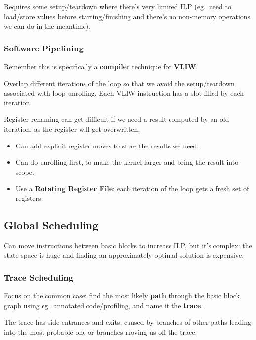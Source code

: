 \documentclass[a4paper, 11pt]{article}
\begin{document}
{{{            Requires some setup/teardown where there's very limited ILP (eg.\ need to load/store values before starting/finishing and there's no non-memory operations we can do in the meantime).
        }
        \subsubsection*{Software Pipelining}
        {
            Remember this is specifically a \textbf{compiler} technique for \textbf{VLIW}.

            Overlap different iterations of the loop so that we avoid the setup/teardown associated with loop unrolling. Each VLIW instruction has a slot filled by each iteration.

            Register renaming can get difficult if we need a result computed by an old iteration, as the register will get overwritten.

            \begin{itemize}
            \item Can add explicit register moves to store the results we need.
            \item Can do unrolling first, to make the kernel larger and bring the result into scope.
            \item Use a \textbf{Rotating Register File}: each iteration of the loop gets a fresh set of registers.
            \end{itemize}
        }
    }
    \subsection*{Global Scheduling}
    {
        Can move instructions between basic blocks to increase ILP, but it's complex: the state space is huge and finding an approximately optimal solution is expensive.

        \subsubsection*{Trace Scheduling}
        {
            \begin{minipage}[t]{0.55\textwidth}
            Focus on the common case: find the most likely \textbf{path} through the basic block graph using eg.\ annotated code/profiling, and name it the \textbf{trace}.

            The trace has side entrances and exits, caused by branches of other paths leading into the most probable one or branches moving us off the trace.


\end{minipage}}}}
\end{document}
